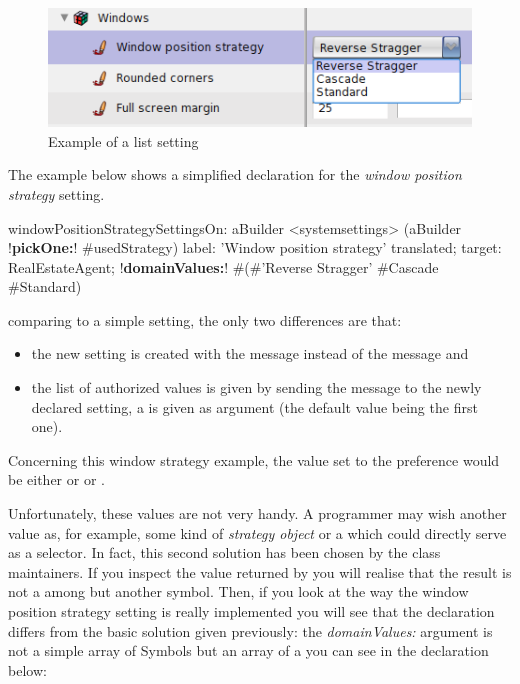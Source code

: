 \documentclass[a4paper,10pt,twoside]{book}
\begin{document}
\begin{figure}[tbh]
\begin{center}
\includegraphics[scale=0.38]{window-position-strategy}
\caption{Example of a list setting}
\end{center}
\end{figure}

The example below shows a simplified declaration for the \textit{window position strategy} setting. 
\begin{code}{}
windowPositionStrategySettingsOn: aBuilder
	<systemsettings>
	(aBuilder !\textbf{pickOne:}! #usedStrategy) 
		label: 'Window position strategy' translated;
		target: RealEstateAgent;
		!\textbf{domainValues:}! #(#'Reverse Stragger' #Cascade #Standard)
\end{code}
comparing to a simple setting, the only two differences are that:
\begin{itemize}
\item 
	the new setting is created with the  message instead of the  message and
\item
	the list of authorized values is given by sending the  message to the newly declared setting, a  is given as argument (the default value being the first one).
\end{itemize}

Concerning this window strategy example, the value set to the preference would be either  or  or . 

Unfortunately, these values are not very handy. A programmer may wish another value as, for example, some kind of \textit{strategy object} or a  which could directly serve as a selector. In fact, this second solution has been chosen by the  class maintainers.
If you inspect the value returned by  you will realise that the result is not a  among  but another symbol. Then, if you look at the way the window position strategy setting is really implemented you will see that the declaration differs from the basic solution given previously: the \textit{domainValues:} argument is not a simple array of {Symbol}s but an array of  a you can see in the declaration below:
\end{document}

